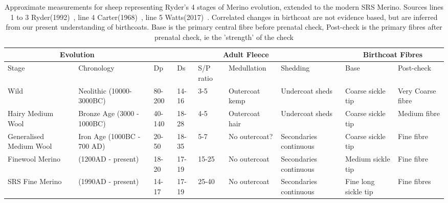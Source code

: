 %

\begin{center}
\begin{landscape}
\begin{table}[h]
\caption{Approximate measurements for sheep representing Ryder's 4 stages of Merino evolution, extended to the modern SRS Merino. Sources lines 1 to 3 Ryder(1992)~\cite{ryde:92}, line 4 Carter(1968)~\cite{cart:68}, line 5 Watts(2017)~\cite{watt:17}. Correlated changes in birthcoat are not evidence based, but are inferred from our present understanding of birthcoats. Base is the primary central fibre before prenatal check, Post-check is the primary fibres after prenatal check, ie the 'strength' of the check} 
\label{tab:evolstages}
\vspace{0.1in}
\begin{tabular}{|p{0.6in}|p{0.6in}|p{0.4in}|p{0.4in}|p{0.6in}|p{0.7in}|p{0.7in}|p{0.7in}|p{0.7in}|}  \hline
 
  \multicolumn{2}{|c|}{Evolution} & \multicolumn{5}{c|}{Adult Fleece} & \multicolumn{2}{c|}{Birthcoat Fibres} \\ \hline
  Stage &  Chronology &  Dp & Ds & S/P ratio & Medullation & Shedding  & Base & Post-check \\ \hline
  Wild   & Neolithic (10000-3000BC) & 80-200 & 14-16 & 3-5 & Outercoat kemp & Undercoat sheds & Coarse sickle tip & Very Coarse fibre \\ \hline
  Hairy Medium Wool & Bronze Age (3000 - 1000BC) & 40-140 & 18-28 & 4-5 & Outercoat hair & Undercoat sheds & Coarse sickle tip & Medium fibre \\ \hline
  Generalised Medium Wool & Iron Age (1000BC - 700 AD) & 20-50 & 18-35 & 5-7  & No outercoat? & Secondaries continuous & Coarse sickle tip & Fine fibre \\  \hline
  Finewool Merino & (1200AD - present) & 18-20 & 17-19 & 15-25 & No outercoat & Secondaries continuous & Medium sickle tip & Fine fibre\\  \hline
  SRS Fine Merino & (1990AD - present) & 14-17 & 17-19 & 25-40 & No outercoat & Secondaries continuous  & Fine long sickle tip  & Fine fibres \\ \hline
\end{tabular}
\end{table}
\end{landscape}
\end{center}

%
